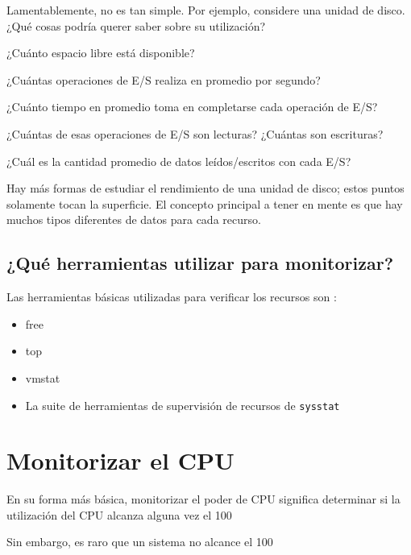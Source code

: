 \documentclass[12pt]{article}
\begin{document}
Lamentablemente, no es tan simple. Por ejemplo, considere una unidad de disco. ¿Qué cosas podría querer saber sobre su utilización?

¿Cuánto espacio libre está disponible?

¿Cuántas operaciones de E/S realiza en promedio por segundo?

¿Cuánto tiempo en promedio toma en completarse cada operación de E/S?

¿Cuántas de esas operaciones de E/S son lecturas? ¿Cuántas son escrituras?

¿Cuál es la cantidad promedio de datos leídos/escritos con cada E/S?

Hay más formas de estudiar el rendimiento de una unidad de disco; estos puntos solamente tocan la superficie. El concepto principal a tener en mente es que hay muchos tipos diferentes de datos para cada recurso.


\subsection*{¿Qué herramientas utilizar para monitorizar?}

Las herramientas básicas utilizadas para verificar los recursos son :

\begin{itemize}
\item free

\item top

\item vmstat

\item La suite de herramientas de supervisión de recursos de \texttt{sysstat}
\end{itemize}


\section*{Monitorizar el CPU}
En su forma más básica, monitorizar el poder de CPU significa determinar si la utilización del CPU alcanza alguna vez el 100%

Sin embargo, es raro que un sistema no alcance el 100%
\end{document}
